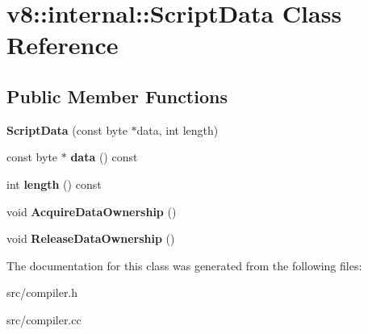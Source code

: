 \hypertarget{classv8_1_1internal_1_1_script_data}{}\section{v8\+:\+:internal\+:\+:Script\+Data Class Reference}
\label{classv8_1_1internal_1_1_script_data}
\subsection*{Public Member Functions}
\begin{DoxyCompactItemize}
\item 
\hypertarget{classv8_1_1internal_1_1_script_data_af29481a7afc246d1f640209814e10158}{}{\bfseries Script\+Data} (const byte $\ast$data, int length)\label{classv8_1_1internal_1_1_script_data_af29481a7afc246d1f640209814e10158}

\item 
\hypertarget{classv8_1_1internal_1_1_script_data_a2cb6ef124f72db2403511467bf8cd8d9}{}const byte $\ast$ {\bfseries data} () const \label{classv8_1_1internal_1_1_script_data_a2cb6ef124f72db2403511467bf8cd8d9}

\item 
\hypertarget{classv8_1_1internal_1_1_script_data_a5291d999dfc83c4589c630291c562f49}{}int {\bfseries length} () const \label{classv8_1_1internal_1_1_script_data_a5291d999dfc83c4589c630291c562f49}

\item 
\hypertarget{classv8_1_1internal_1_1_script_data_a6461a45e69ebeb126945be3a4f28bc8e}{}void {\bfseries Acquire\+Data\+Ownership} ()\label{classv8_1_1internal_1_1_script_data_a6461a45e69ebeb126945be3a4f28bc8e}

\item 
\hypertarget{classv8_1_1internal_1_1_script_data_adeb796cca677fc9bc0f802db04c78778}{}void {\bfseries Release\+Data\+Ownership} ()\label{classv8_1_1internal_1_1_script_data_adeb796cca677fc9bc0f802db04c78778}

\end{DoxyCompactItemize}


The documentation for this class was generated from the following files\+:\begin{DoxyCompactItemize}
\item 
src/compiler.\+h\item 
src/compiler.\+cc\end{DoxyCompactItemize}
